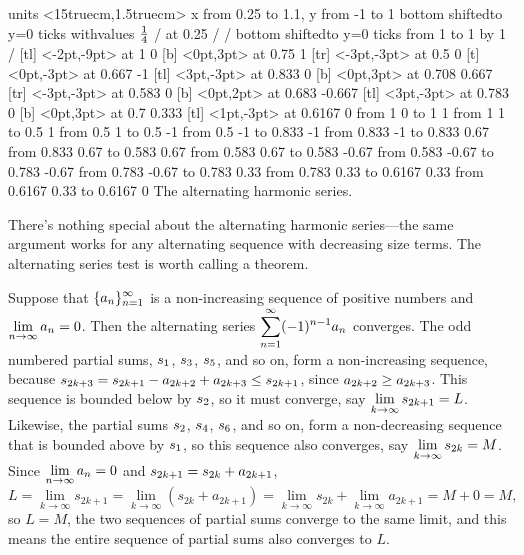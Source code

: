 \figure
\texonly
\vbox{\beginpicture
\normalgraphs
\ninepoint
\setcoordinatesystem units <15truecm,1.5truecm>
\setplotarea x from 0.25 to 1.1, y from -1 to 1
\axis bottom shiftedto y=0 ticks withvalues {$1\over4$} / at 0.25 / /
\axis bottom shiftedto y=0 ticks from 1 to 1 by 1 /
 [tl] <-2pt,-9pt> at 1 0
 [b] <0pt,3pt> at 0.75 1
 [tr] <-3pt,-3pt> at 0.5 0
 [t] <0pt,-3pt> at 0.667 -1
 [tl] <3pt,-3pt> at 0.833 0
 [b] <0pt,3pt> at 0.708 0.667
 [tr] <-3pt,-3pt> at 0.583 0
 [b] <0pt,2pt> at 0.683 -0.667
 [tl] <3pt,-3pt> at 0.783 0
 [b] <0pt,3pt> at 0.7 0.333
 [tl] <1pt,-3pt> at 0.6167 0
\putrule from 1 0 to 1 1
\arrow <4pt> [0.35, 1] from 1 1 to 0.5 1
\putrule from 0.5 1 to 0.5 -1
\arrow <4pt> [0.35, 1] from 0.5 -1 to 0.833 -1
\putrule from 0.833 -1 to 0.833 0.67
\arrow <4pt> [0.35, 1] from 0.833 0.67 to 0.583 0.67
\putrule from 0.583 0.67 to 0.583 -0.67
\arrow <4pt> [0.35, 1] from 0.583 -0.67 to 0.783 -0.67
\putrule from  0.783 -0.67 to  0.783 0.33
\arrow <4pt> [0.35, 1] from 0.783 0.33 to 0.6167 0.33
\putrule from  0.6167 0.33 to  0.6167 0
\endpicture}
\endtexonly
{}
\begincaption
The alternating harmonic series.
\endcaption
\endfigure

There's nothing special about the alternating harmonic series---the
same argument works for any alternating sequence with decreasing size
terms. The alternating series test is worth calling a theorem.

\thm Suppose that $\displaystyle\{a_n\}_{n=1}^\infty$ is a non-increasing
sequence of positive numbers and $\displaystyle\lim_{n\to\infty}a_n=0$. Then the
alternating series $\displaystyle\sum_{n=1}^\infty (-1)^{n-1} a_n$ converges.
\endthm
\proof The odd numbered partial sums, $\displaystyle s_1$, $\displaystyle s_3$, $\displaystyle s_5$,
and so on, form a non-increasing sequence, because
$\displaystyle s_{2k+3}=s_{2k+1}-a_{2k+2}+a_{2k+3}\le s_{2k+1}$, since
$\displaystyle a_{2k+2}\ge a_{2k+3}$. This sequence is bounded below by
$\displaystyle s_2$, so it must converge, say 
$\displaystyle\lim_{k\to\infty}s_{2k+1}=L$.
Likewise, the partial sums $\displaystyle s_2$, $\displaystyle s_4$, $\displaystyle s_6$,
and so on, form a non-decreasing sequence that is bounded above by
$\displaystyle s_1$, so this sequence also converges, say 
$\displaystyle\lim_{k\to\infty}s_{2k}=M$. Since $\displaystyle\lim_{n\to\infty} a_n=0$ and
$\displaystyle s_{2k+1}= s_{2k}+a_{2k+1}$,
$$
  L=\lim_{k\to\infty}s_{2k+1}=\lim_{k\to\infty}(s_{2k}+a_{2k+1})=
  \lim_{k\to\infty}s_{2k}+\lim_{k\to\infty}a_{2k+1}=M+0=M,
$$
so $L=M$, the two sequences of partial sums converge to the same
limit, and this means the entire sequence of partial sums also
converges to $L$.
\endproof

